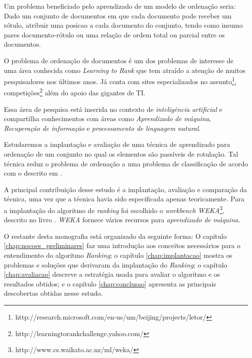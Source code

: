 Um problema beneficiado pelo aprendizado de um modelo de ordenação seria: Dado um conjunto de documentos em que cada documento pode receber um rótulo, atribuir uma posicao a cada documento do conjunto, tendo como insumo pares documento-rótulo ou uma relação de ordem total ou parcial entre os documentos.

O problema de ordenação de documentos é um dos problemas de interesse de uma área  conhecida como \emph{Learning to Rank} que tem atraído a atenção de muitos pesquisadores nos últimos anos. Já conta com sites especializados no assunto\footnote{http://research.microsoft.com/en-us/um/beijing/projects/letor/}, competições\footnote{http://learningtorankchallenge.yahoo.com/} além do apoio das gigantes de TI.

Essa área de pesquisa está inserida no contexto de \emph{inteligência artificial} e compartilha conhecimentos com áreas como \emph{Aprendizado de máquina}, \emph{Recuperação de informação} e \emph{processamento de linguagem natural}.

Estudaremos a implantação e avaliação de uma técnica de aprendizado para ordenação de um conjunto no qual os elementos são passíveis de rotulação. Tal técnica reduz o problema de ordenação a uma problema de classificação de acordo com o descrito em \cite{langford08}.

A principal contribuição desse estudo é a implantação, avaliação e comparação da técnica, uma vez que a técnica havia sido especificada apenas teoricamente. Para a implantação do algoritmo de \emph{ranking} foi escolhido o  \emph{workbench WEKA}\footnote{http://www.cs.waikato.ac.nz/ml/weka/}, descrito no livro \cite{wekabook}. \emph{WEKA} fornece vários recursos para \emph{aprendizado de máquina}.

O restante desta monografia está organizado da seguinte forma: O capítulo \ref{chap:nocoes_preliminares} faz uma introdução aos conceitos necessários para o entendimento do algoritmo \emph{Ranking}; o capítulo \ref{chap:implantacao} mostra os problemas e soluções que derivaram da implantação do \emph{Ranking}; o capítulo \ref{chap:avaliacao} descreve a estratégia usada para avaliar o algoritmo e os resultados obtidos; e o capítulo \ref{chap:conclusao} apresenta as principais descobertas obtidas nesse estudo.